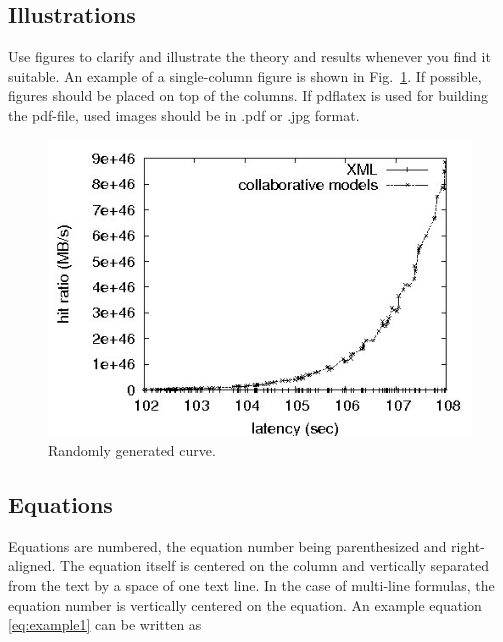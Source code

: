 \documentclass{article}
\begin{document}
\subsection{Illustrations}
\label{ssec:illustr}
Use figures to clarify and illustrate the theory and results whenever you find it suitable. An example of a single-column figure is shown in Fig.~\ref{fig1}. If possible, figures should be placed on top of the columns. If pdflatex is used for building the pdf-file, used images should be in .pdf or .jpg format.

\begin{figure}[t]
\begin{center}
  \includegraphics[width=\linewidth]{figure1.jpg}
\end{center}

\caption{Randomly generated curve.}\label{fig1}
\end{figure}



\subsection{Equations}
\label{ssec:eq}
Equations are numbered, the equation number being parenthesized and right-aligned. The equation itself is centered on the column and vertically separated from the text by a space of one text line. In the case of multi-line formulas, the equation number is vertically centered on the equation. An example equation \ref{eq:example1} can be written as
\end{document}

